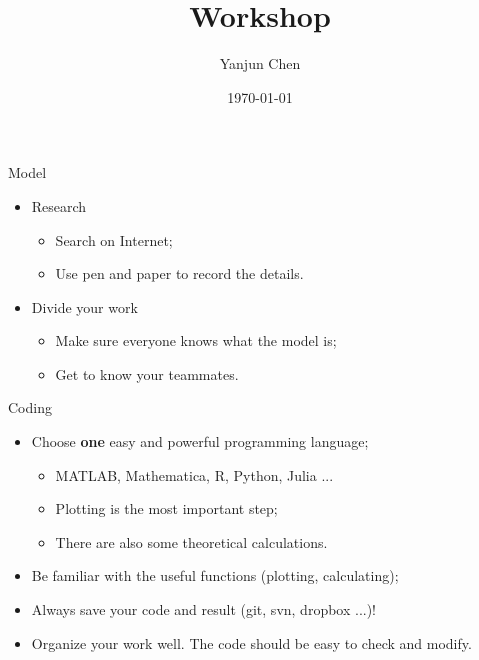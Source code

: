 \documentclass{beamer}
\title[University Physics Competition]{Workshop} %
\author{Yanjun Chen} %
\institute[UM-SJTU JI] %
{
    University of Michigan - Shanghai Jiao Tong University Joint Institute\\%
\medskip
}
\date{\today} %
\begin{document}
\begin{frame}
    \titlepage %
\end{frame}


\section{} %


\begin{frame}{Model}
    \begin{itemize}
        \item Research
        \begin{itemize}
            \item Search on Internet;
            \item Use pen and paper to record the details.
        \end{itemize}
        \item Divide your work
        \begin{itemize}
            \item Make sure everyone knows what the model is;
            \item Get to know your teammates.
        \end{itemize}
    \end{itemize}
\end{frame}

\begin{frame}{Coding}
    \begin{itemize}
        \item Choose \textbf{one} easy and powerful programming language;
        \begin{itemize}
            \item MATLAB, Mathematica, R, Python, Julia ...
            \item Plotting is the most important step;
            \item There are also some theoretical calculations.
        \end{itemize}
        \item Be familiar with the useful functions (plotting, calculating);
        \item Always save your code and result (git, svn, dropbox ...)!
        \item Organize your work well. The code should be easy to check and modify.
    \end{itemize}
\end{frame}
\end{document}
